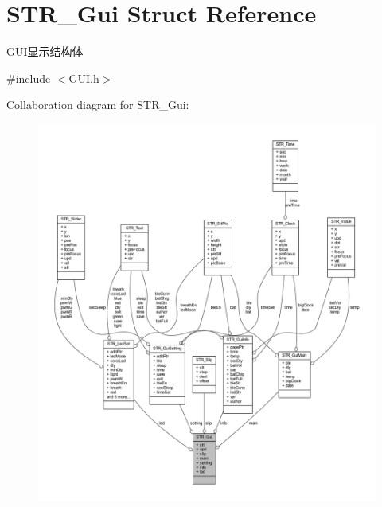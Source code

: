 \hypertarget{struct_s_t_r___gui}{\section{\-S\-T\-R\-\_\-\-Gui \-Struct \-Reference}
\label{struct_s_t_r___gui}
}


\-G\-U\-I显示结构体  




{\ttfamily \#include $<$\-G\-U\-I.\-h$>$}



\-Collaboration diagram for \-S\-T\-R\-\_\-\-Gui\-:\nopagebreak
\begin{figure}[H]
\begin{center}
\leavevmode
\includegraphics[width=350pt]{struct_s_t_r___gui__coll__graph}
\end{center}
\end{figure}
